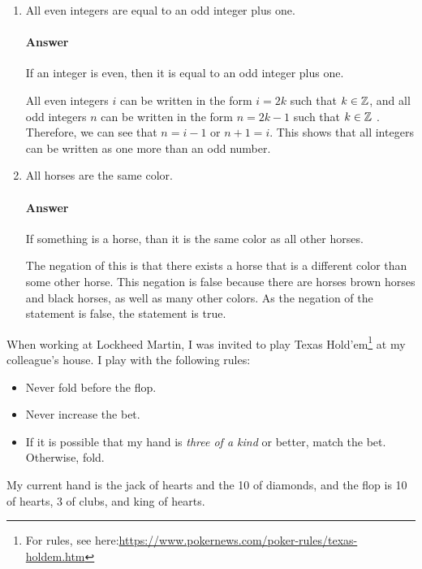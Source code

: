 \documentclass{article}
\begin{document}
\begin{enumerate}

    \item All even integers are equal to an odd integer plus one.

        \paragraph{Answer}

	If an integer is even, then it is equal to an odd integer plus one.

	All even integers $i$ can be written in the form $i=2k$ such that $k \in {\mathbb Z}$,
	and all odd integers $n$ can be written in the form $n=2k-1$ such that $k \in {\mathbb Z}$ .
	Therefore, we can see that $n=i-1$ or $n+1=i$. This shows that all integers can 
	be written as one more than an odd number.

    \item All horses are the same color.

        \paragraph{Answer}
	
	If something is a horse, than it is the same color as all other horses.

	The negation of this is that there exists a horse that is a different color 
	than some other horse. This negation is false because there are horses brown 
	horses and black horses, as well as many other colors. As the negation of the
	statement is false, the statement is true.

\end{enumerate}



When working at Lockheed Martin, I was invited to play Texas
Hold'em\footnote{For rules, see
here:\url{https://www.pokernews.com/poker-rules/texas-holdem.htm}} at my
colleague's house.  I play with the following rules:
\begin{itemize}
    \item Never fold before the flop.
    \item Never increase the bet.
    \item If it is possible that my hand is \emph{three of a kind} or better,
        match the bet.  Otherwise, fold.
\end{itemize}
My current hand is the jack of hearts and the 10 of diamonds, and the flop is 10
of hearts, 3 of clubs, and king of hearts.
\end{document}
